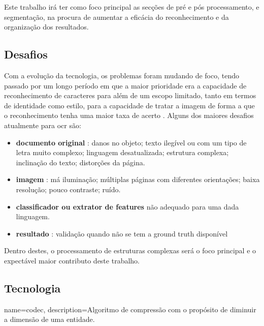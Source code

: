 Este trabalho irá ter como foco principal as secções de pré e pós processamento, e segmentação, na procura de aumentar a eficácia do reconhecimento e da organização dos resultados.



\subsection{Desafios}
\label{ocr_desafios}


Com a evolução da tecnologia, os problemas foram mudando de foco, tendo passado por um longo período em que a maior prioridade era a capacidade de reconhecimento de caracteres para além de um escopo limitado, tanto em termos de identidade como estilo, para a capacidade de tratar a imagem de forma a que o reconhecimento tenha uma maior taxa de acerto \citep{4283429}.
Alguns dos maiores desafios atualmente para \acrshort{ocr} são:
\begin{itemize}
    \item \textbf{documento original} : danos  no objeto; texto ilegível ou com um tipo de letra muito complexo; linguagem desatualizada; estrutura complexa; inclinação do texto; distorções da página.
    \item \textbf{imagem} : má iluminação; múltiplas páginas com diferentes orientações; baixa resolução; pouco contraste; ruído.
    \item \textbf{classificador ou extrator de features} não adequado para uma dada linguagem.
    \item \textbf{resultado} : validação quando não se tem a \gls{ground truth} disponível
\end{itemize}

Dentro destes, o processamento de estruturas complexas será o foco principal e o expectável maior contributo deste trabalho.


\subsection{Tecnologia}

{
    name=codec,
    description={Algoritmo de compressão com o propósito de diminuir a dimensão de uma entidade.}
}


